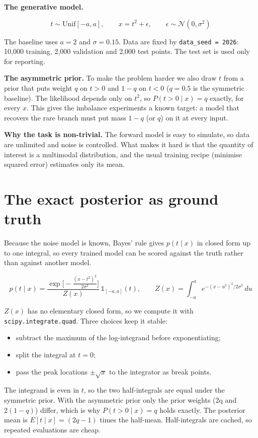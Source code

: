 \documentclass[11pt,a4paper]{article}
\begin{document}
\textbf{The generative model.}

\[
t \sim \mathrm{Unif}[-a,a], \qquad x = t^2 + \epsilon, \qquad \epsilon \sim \mathcal{N}(0,\sigma^2)
\]

The baseline uses $a = 2$ and $\sigma  = 0.15$. Data are fixed by \texttt{data\_\allowbreak{}seed = 2026}: 10,000 training, 2,000 validation and 2,000 test points. The test set is used only for reporting.

\textbf{The asymmetric prior.} To make the problem harder we also draw $t$ from a prior that puts weight $q$ on $t > 0$ and $1 - q$ on $t < 0$ ($q = 0.5$ is the symmetric baseline). The likelihood depends only on $t^{2}$, so $P(t > 0 \mid  x) = q$ exactly, for every $x$. This gives the imbalance experiments a known target: a model that recovers the rare branch must put mass $1 - q$ (or $q$) on it at every input.

\textbf{Why the task is non-trivial.} The forward model is easy to simulate, so data are unlimited and noise is controlled. What makes it hard is that the quantity of interest is a multimodal distribution, and the usual training recipe (minimise squared error) estimates only its mean.

\section{The exact posterior as ground truth}
Because the noise model is known, Bayes' rule gives $p(t \mid  x)$ in closed form up to one integral, so every trained model can be scored against the truth rather than against another model.

\[
p(t\mid x)=\frac{\exp\!\big[-\tfrac{(x-t^2)^2}{2\sigma^2}\big]}{Z(x)}\,\mathbb{1}_{[-a,a]}(t),\qquad Z(x)=\int_{-a}^{a} e^{-(x-u^2)^2/2\sigma^2}\,du
\]

$Z(x)$ has no elementary closed form, so we compute it with \texttt{scipy.integrate.quad}. Three choices keep it stable:

\begin{itemize}
\item subtract the maximum of the log-integrand before exponentiating;
\item split the integral at $t = 0$;
\item pass the peak locations $\pm \sqrt{x}$ to the integrator as break points.
\end{itemize}

The integrand is even in $t$, so the two half-integrals are equal under the symmetric prior. With the asymmetric prior only the prior weights (2q and $2(1 - q)$) differ, which is why $P(t > 0 \mid  x) = q$ holds exactly. The posterior mean is $E[t \mid  x] = (2q - 1)$ times the half-mean. Half-integrals are cached, so repeated evaluations are cheap.
\end{document}
